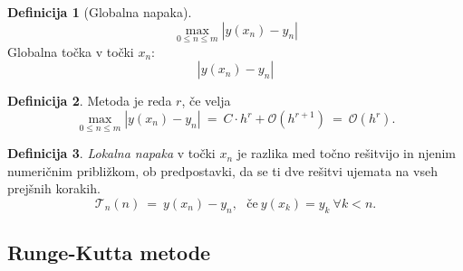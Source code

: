 \documentclass[11pt]{article}
\newcommand{\OO}{\mathcal{O}}
\newcommand{\T}{\mathcal{T}}
\theoremstyle{definition}
\newtheorem{definicija}{Definicija}[section]
\theoremstyle{definition}
\begin{document}
\begin{definicija}[Globalna napaka]

$$\max_{0 \leq n \leq m} |y(x_n) - y_n|$$
Globalna točka v točki $x_n$:
$$|y(x_n) - y_n|$$

\end{definicija}
\vspace{0.5cm}

\begin{definicija}

Metoda je reda $r$, če velja
$$\max_{0 \leq n \leq m} |y(x_n) - y_n| ~=~ C \cdot h^r + \OO(h^{r+1}) ~=~ \OO(h^r).$$

\end{definicija}
\vspace{0.5cm}

\begin{definicija}

\textit{Lokalna napaka} v točki $x_n$ je razlika med točno rešitvijo in njenim numeričnim približkom, ob predpostavki, da se ti dve rešitvi ujemata na vseh prejšnih korakih.
$$\T_n(n) ~=~ y(x_n) - y_n, ~~~\text{če}~ y(x_k) = y_k ~\forall k < n.$$

\end{definicija}
\vspace{0.5cm}


\subsection{Runge-Kutta metode}
\vspace{0.5cm}
\end{document}
